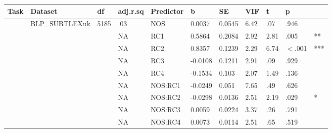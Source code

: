 \begin{table}[ht]
\centering
\begingroup\normalsize
\begin{tabular}{lllllllllll}
  \hline
Task & Dataset & df & adj.r.sq & Predictor & b & SE & VIF & t & p &  \\ 
  \hline
 & BLP\_SUBTLEXuk & 5185 & .03 & NOS & 0.0037 & 0.0545 & 6.42 & .07 & .946 &   \\ 
   &  &  & NA & RC1 & 0.5864 & 0.2084 & 2.92 & 2.81 & .005 & ** \\ 
   &  &  & NA & RC2 & 0.8357 & 0.1239 & 2.29 & 6.74 & $<$.001 & *** \\ 
   &  &  & NA & RC3 & -0.0108 & 0.1211 & 2.91 & .09 & .929 &   \\ 
   &  &  & NA & RC4 & -0.1534 & 0.103 & 2.07 & 1.49 & .136 &   \\ 
   &  &  & NA & NOS:RC1 & -0.0249 & 0.051 & 7.65 & .49 & .626 &   \\ 
   &  &  & NA & NOS:RC2 & -0.0298 & 0.0136 & 2.51 & 2.19 & .029 & * \\ 
   &  &  & NA & NOS:RC3 & 0.0059 & 0.0224 & 3.37 & .26 & .791 &   \\ 
   &  &  & NA & NOS:RC4 & 0.0073 & 0.0114 & 2.51 & .65 & .519 &   \\ 
   \hline
\end{tabular}
\endgroup
\end{table}
